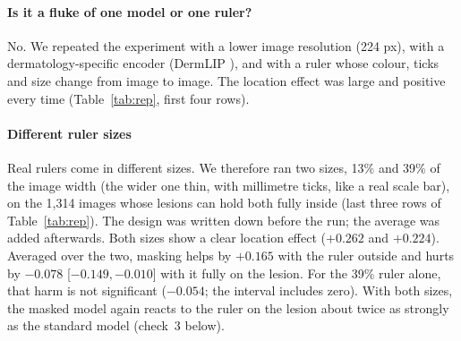 \documentclass[11pt,a4paper]{article}
\begin{document}
\FloatBarrier\paragraph{Is it a fluke of one model or one ruler?} No. We repeated the experiment with a lower image resolution (224 px), with a
dermatology-specific encoder (DermLIP \citep{yan2025derm1m}), and with a ruler whose colour, ticks and size change from
image to image. The location effect was large and positive every time (Table~\ref{tab:rep}, first four rows).
\begin{table}[!htb]\centering\small
\caption{The ruler result repeated with other settings (masked $-$ standard, reversed test).}\label{tab:rep}
\end{table}

\paragraph{Different ruler sizes} Real rulers come in different sizes. We therefore ran two sizes, 13\% and 39\% of
the image width (the wider one thin, with millimetre ticks, like a real scale bar), on the 1,314 images whose lesions
can hold both fully inside (last three rows of Table~\ref{tab:rep}). The design was written down before the run; the
average was added afterwards. Both sizes show a clear location effect ($+0.262$ and $+0.224$). Averaged over the two,
masking helps by $+0.165$ with the ruler outside and hurts by $-0.078$ [$-0.149, -0.010$] with it fully on the lesion.
For the 39\% ruler alone, that harm is not significant ($-0.054$; the interval includes zero). With both sizes, the
masked model again reacts to the ruler on the lesion about twice as strongly as the standard model (check~3 below).
\end{document}
